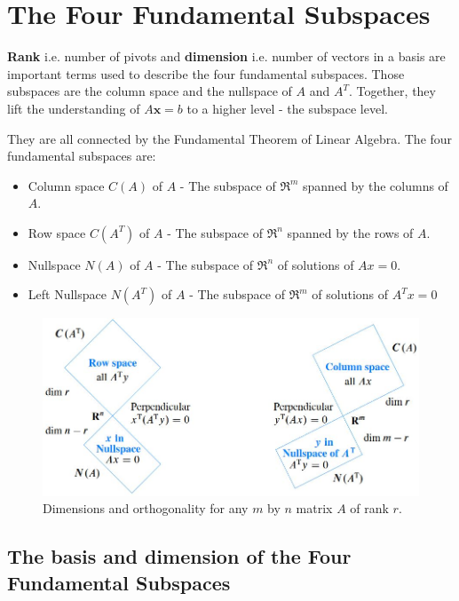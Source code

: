 \documentclass[10pt,a4paper]{article}
\begin{document}
\section{The Four Fundamental Subspaces}

\textbf{Rank} i.e. number of pivots and \textbf{dimension} i.e. number of vectors in a basis are
important terms used to describe the four fundamental subspaces. Those subspaces are the column
space and the nullspace of $A$ and $A^T$. Together, they lift the understanding of $A \textbf{x}=b$
to a higher level - the subspace level.

They are all connected by the Fundamental Theorem of Linear Algebra.  The four fundamental subspaces are:
\begin{itemize}
    \item Column space $C(A)$ of $A$ - The subspace of $\Re^m$ spanned by the columns of $A$. 
    \item Row space $C(A^T)$ of $A$ - The subspace of $\Re^n$ spanned by the rows of $A$.
    \item Nullspace $N(A)$ of $A$ - The subspace of $\Re^n$ of solutions of $Ax=0$.
    \item Left Nullspace $N(A^T)$ of $A$ - The subspace of $\Re^m$ of solutions of $A^T x = 0$
\end{itemize}

\begin{figure} [h!]
    \centering
    \includegraphics[scale=0.6]{Fundasub.JPG}
    \caption{Dimensions and orthogonality for any $m$ by $n$ matrix $A$ of rank $r$.}
\end{figure}

\subsection{The basis and dimension of the Four Fundamental Subspaces}
\end{document}
